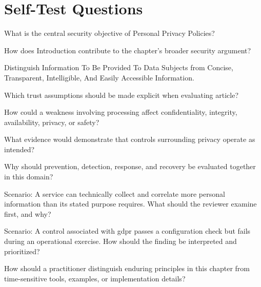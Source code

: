 \documentclass[11pt,letterpaper]{article}
\begin{document}
\section*{Self-Test Questions}
\begin{CornellRecallList}
\item What is the central security objective of Personal Privacy Policies?
\item How does Introduction contribute to the chapter's broader security argument?
\item Distinguish Information To Be Provided To Data Subjects from Concise, Transparent, Intelligible, And Easily Accessible Information.
\item Which trust assumptions should be made explicit when evaluating article?
\item How could a weakness involving processing affect confidentiality, integrity, availability, privacy, or safety?
\item What evidence would demonstrate that controls surrounding privacy operate as intended?
\item Why should prevention, detection, response, and recovery be evaluated together in this domain?
\item Scenario: A service can technically collect and correlate more personal information than its stated purpose requires. What should the reviewer examine first, and why?
\item Scenario: A control associated with gdpr passes a configuration check but fails during an operational exercise. How should the finding be interpreted and prioritized?
\item How should a practitioner distinguish enduring principles in this chapter from time-sensitive tools, examples, or implementation details?
\end{CornellRecallList}
\end{document}
